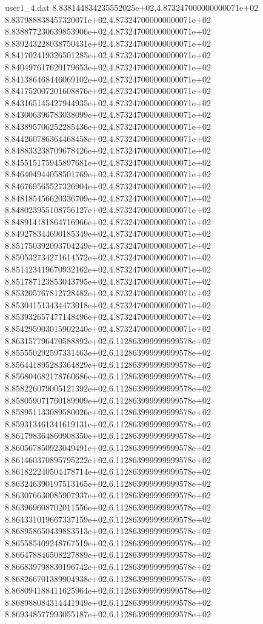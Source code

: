 \begin{filecontents}{user1_4.dat}
8.838144834235552025e+02,4.873247000000000071e+02
8.837988838457320071e+02,4.873247000000000071e+02
8.838877230639853906e+02,4.873247000000000071e+02
8.839243228038750431e+02,4.873247000000000071e+02
8.841702419326501285e+02,4.873247000000000071e+02
8.840497617620179653e+02,4.873247000000000071e+02
8.841386468446069102e+02,4.873247000000000071e+02
8.841752007201608876e+02,4.873247000000000071e+02
8.843165145427944935e+02,4.873247000000000071e+02
8.843006396783038099e+02,4.873247000000000071e+02
8.843895706252285436e+02,4.873247000000000071e+02
8.844260786364468458e+02,4.873247000000000071e+02
8.848833238709678426e+02,4.873247000000000071e+02
8.845515175945897681e+02,4.873247000000000071e+02
8.846404944058501769e+02,4.873247000000000071e+02
8.846769565527326904e+02,4.873247000000000071e+02
8.848185456620336709e+02,4.873247000000000071e+02
8.848023955108756127e+02,4.873247000000000071e+02
8.848914181864716966e+02,4.873247000000000071e+02
8.849278344690185349e+02,4.873247000000000071e+02
8.851750392093704249e+02,4.873247000000000071e+02
8.850532734271614572e+02,4.873247000000000071e+02
8.851423419670932162e+02,4.873247000000000071e+02
8.851787123853043795e+02,4.873247000000000071e+02
8.853205767812728482e+02,4.873247000000000071e+02
8.853041513434473018e+02,4.873247000000000071e+02
8.853932657477148496e+02,4.873247000000000071e+02
8.854295903015902240e+02,4.873247000000000071e+02
8.863157796470588892e+02,6.112863999999999578e+02
8.855550292597331463e+02,6.112863999999999578e+02
8.856441895283364829e+02,6.112863999999999578e+02
8.856804682178760686e+02,6.112863999999999578e+02
8.858226079005121392e+02,6.112863999999999578e+02
8.858059071760189909e+02,6.112863999999999578e+02
8.858951133089580026e+02,6.112863999999999578e+02
8.859313461341619131e+02,6.112863999999999578e+02
8.861798364860908350e+02,6.112863999999999578e+02
8.860567850923049491e+02,6.112863999999999578e+02
8.861460370895795222e+02,6.112863999999999578e+02
8.861822240504478714e+02,6.112863999999999578e+02
8.863246390197513165e+02,6.112863999999999578e+02
8.863076630085907937e+02,6.112863999999999578e+02
8.863969608702011556e+02,6.112863999999999578e+02
8.864331019667337159e+02,6.112863999999999578e+02
8.868958650439883513e+02,6.112863999999999578e+02
8.865585409248767519e+02,6.112863999999999578e+02
8.866478846508227889e+02,6.112863999999999578e+02
8.866839798830196742e+02,6.112863999999999578e+02
8.868266701389904938e+02,6.112863999999999578e+02
8.868094188411625964e+02,6.112863999999999578e+02
8.868988084314441949e+02,6.112863999999999578e+02
8.869348577993055187e+02,6.112863999999999578e+02

\end{filecontents}

